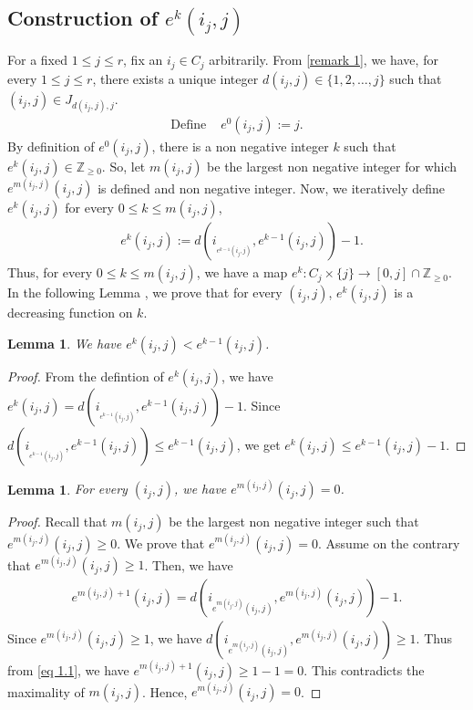 \documentclass[12pt,reqno]{amsart}
\numberwithin{equation}{section}
\newtheorem{lemma}[theorem]{Lemma}
\theoremstyle{definition}
\begin{document}
\subsection{Construction of $e^{k}(i_{j},j)$}\label{construction of e^{k}}
For a fixed $1\leq j\leq r$, fix an  $i_{j}\in C_{j}$ arbitrarily. From \cref{remark 1}, we have, for every $1\leq j\leq r$, there exists a unique integer $ d(i_{j},j)\in\{1,2,\ldots,j\}$ such that $(i_{j},j)\in J_{d(i_{j},j),j}$. 
\begin{align*}
	\text{Define } & e^{0}(i_{j},j):=j.
\end{align*}
By definition of $e^{0}(i_{j},j)$, there is a non negative integer $k$ such that $e^{k}(i_{j},j)\in\mathbb{Z}_{\geq0}$. So, let $m(i_{j},j)$ be the largest non negative integer for which $e^{m(i_{j},j)}(i_{j},j)$ is defined and non negative integer. Now, we iteratively define $e^{k}(i_{j},j)$ for every $0\leq k\leq m(i_{j},j)$, 
\begin{align}\label{Special eq 6}
	\text{}& e^{k}(i_{j},j):= d(i_{_{e^{k-1}(i_{j},j)}},e^{k-1}(i_{j},j))-1.	
\end{align}
Thus, for every $0\leq k\leq m(i_{j},j)$, we have a map $e^{k}:C_{j}\times\{j\}\longrightarrow[0,j]\cap\mathbb{Z}_{\geq 0}$. In the following Lemma , we prove that for every $(i_{j},j)$, $e^{k}(i_{j},j)$ is a decreasing function on $k$.
 \begin{lemma}\label{lemma 2.1}
 	 We have $e^{k}(i_{j},j)<e^{k-1}(i_{j},j)$.
 \end{lemma}
\begin{proof}
	 From the defintion of $e^{k}(i_{j},j)$, we have $e^{k}(i_{j},j)= d(i_{_{e^{k-1}(i_{j},j)}},e^{k-1}(i_{j},j))-1$. Since $d(i_{_{e^{k-1}(i_{j},j)}},e^{k-1}(i_{j},j))\leq e^{k-1}(i_{j},j)$, we get $e^{k}(i_{j},j)\leq e^{k-1}(i_{j},j)-1$.
\end{proof}
\begin{lemma}\label{e^{m}=0}
	For every $(i_{j},j)$, we have $e^{m(i_{j},j)}(i_{j},j)=0$.
\end{lemma}
\begin{proof}
	Recall that $m(i_{j},j)$ be the largest non negative integer such that $e^{m(i_{j},j)}(i_{j},j)\geq 0$. We prove that $e^{m(i_{j},j)}(i_{j},j)=0$. Assume on the contrary that $e^{m(i_{j},j)}(i_{j},j)\geq 1$. Then, we have \begin{align}\label{eq 1.1}
	e^{m(i_{j},j)+1}(i_{j},j)=d(i_{e^{m(i_{j},j)}(i_{j},j)},e^{m(i_{j},j)}(i_{j},j))-1.
\end{align}
Since $e^{m(i_{j},j)}(i_{j},j)\geq 1$, we have $d(i_{e^{m(i_{j},j)}(i_{j},j)},e^{m(i_{j},j)}(i_{j},j))\geq 1$. Thus from \cref{eq 1.1}, we have $e^{m(i_{j},j)+1}(i_{j},j)\geq 1-1=0$. This contradicts the maximality of $m(i_{j},j)$. Hence, $e^{m(i_{j},j)}(i_{j},j)=0$.
\end{proof}
\end{document}
